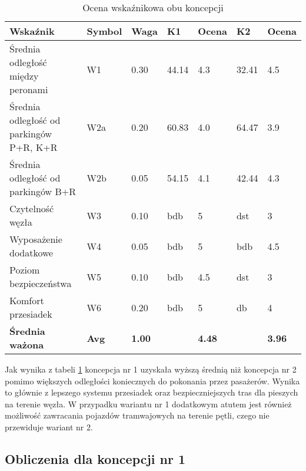 \documentclass[twoside,12pt]{article}
\begin{document}
     \begin{table}[H]
       \centering
       \caption{Ocena wskaźnikowa obu koncepcji}
     \begin{tabular}{lllllll}
     \toprule
     \textbf{Wskaźnik} & \textbf{Symbol} & \textbf{Waga} & \textbf{K1} & \textbf{Ocena} & \textbf{K2} & \textbf{Ocena} \\
     \midrule
     \footnotesize{Średnia odległość między peronami} & W1         & 0.30       & 44.14      & 4.3        & 32.41      & 4.5 \\
     \footnotesize{Średnia odległość od parkingów P+R, K+R} & W2a        & 0.20       & 60.83      & 4.0        & 64.47      & 3.9 \\
     \footnotesize{Średnia odległość od parkingów B+R} & W2b        & 0.05       & 54.15      & 4.1        & 42.44      & 4.3 \\
     \footnotesize{Czytelność węzła} & W3         & 0.10       & bdb        & 5          & dst        & 3 \\
     \footnotesize{Wyposażenie dodatkowe} & W4         & 0.05       & bdb        & 5          & bdb        & 4.5 \\
     \footnotesize{Poziom bezpieczeństwa} & W5         & 0.10       & bdb        & 4.5        & dst        & 3 \\
     \footnotesize{Komfort przesiadek} & W6         & 0.20       & bdb        & 5          & db         & 4 \\
     \midrule
     \textbf{Średnia ważona} & \textbf{Avg} & \textbf{1.00} &            & \textbf{4.48} &            & \textbf{3.96} \\
     \bottomrule
     \end{tabular}%

         
       \label{analiza}
     \end{table}%
     
     Jak wynika z tabeli \ref{analiza} koncepcja nr 1 uzyskała wyższą średnią niż koncepcja nr 2 pomimo większych odległości koniecznych do pokonania przez pasażerów. Wynika to głównie z lepszego systemu przesiadek oraz bezpieczniejszych tras dla pieszych na terenie węzła. W przypadku wariantu nr 1 dodatkowym atutem jest również możliwość zawracania pojazdów tramwajowych na terenie pętli, czego nie przewiduje wariant nr 2. 
     
     \subsection{Obliczenia dla koncepcji nr 1}
\end{document}
